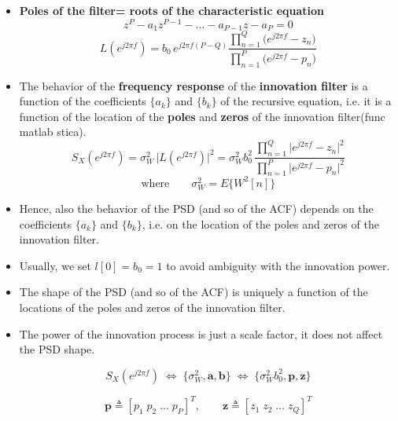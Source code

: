 \begin{itemize}
\[
= z^{P-Q}\,
  \frac{b_{0} z^{Q} + b_{1} z^{Q-1} + \cdots + b_{Q-1} z + b_{Q}}
       {z^{P} - a_{1} z^{P-1} - \cdots - a_{P-1} z - a_{P}}
= b_{0} z^{P-Q}\,
  \frac{z^{Q} + \dfrac{b_{1}}{b_{0}} z^{Q-1} + \cdots + \dfrac{b_{Q}}{b_{0}}}
       {z^{P} - a_{1} z^{P-1} - \cdots - a_{P}}
\]

\[
= b_{0} z^{P-Q}\,
  \frac{\displaystyle\prod_{n=1}^{Q} (z - z_{n})}
       {\displaystyle\prod_{n=1}^{P} (z - p_{n})}
\]
\noindent \item \textbf{Poles of the filter= roots of the characteristic equation}
\[
z^P-a_1z^{P-1}-...-a_{P-1}z-a_P=0
\]
\[
L\!\left(e^{j2\pi f}\right)
= b_{0}\, e^{j2\pi f (P-Q)}
  \frac{\displaystyle\prod_{n=1}^{Q}\bigl(e^{j2\pi f} - z_{n}\bigr)}
       {\displaystyle\prod_{n=1}^{P}\bigl(e^{j2\pi f} - p_{n}\bigr)}
\]

\item The behavior of the \textbf{frequency response} of the \textbf{innovation filter} is a function of the coefficients \(\{a_k\}\) and \(\{b_k\}\) of the recursive equation, i.e. it is a function of the location of the \textbf{poles} and \textbf{zeros} of the innovation filter(func matlab stica).
\[
S_{X}\!\left(e^{j2\pi f}\right)
= \sigma_{W}^{2}\,\bigl|L(e^{j2\pi f})\bigr|^{2}
= \sigma_{W}^{2} b_{0}^{2}\,
  \frac{\displaystyle\prod_{n=1}^{Q}
        \bigl|e^{j2\pi f} - z_{n}\bigr|^{2}}
       {\displaystyle\prod_{n=1}^{P}
        \bigl|e^{j2\pi f} - p_{n}\bigr|^{2}}
\]
\vspace{-1em}
\[
\text{where}\qquad
\sigma_{W}^{2} = E\{W^{2}[n]\}
\]

\item Hence, also the behavior of the PSD (and so of the ACF) depends on the coefficients \(\{a_k\}\) and \(\{b_k\}\), i.e. on the location of the poles and zeros of the innovation filter.
\item Usually, we set \(l[0]=b_0=1\) to avoid ambiguity with the innovation power.
\item The shape of the PSD (and so of the ACF) is uniquely a function of the locations of the poles and zeros of the innovation filter.
\item The power of the innovation process is just a scale factor, it does not affect the PSD shape.

\[
S_{X}\!\left(e^{j2\pi f}\right)
\;\Longleftrightarrow\;
\bigl\{\sigma_{W}^{2},\mathbf{a},\mathbf{b}\bigr\}
\;\Longleftrightarrow\;
\bigl\{\sigma_{W}^{2} b_{0}^{2},\mathbf{p},\mathbf{z}\bigr\}
\]

\[
\mathbf{p} \triangleq [p_{1}\; p_{2}\; \dots\; p_{P}]^{T},
\qquad
\mathbf{z} \triangleq [z_{1}\; z_{2}\; \dots\; z_{Q}]^{T}
\]


\end{itemize}
